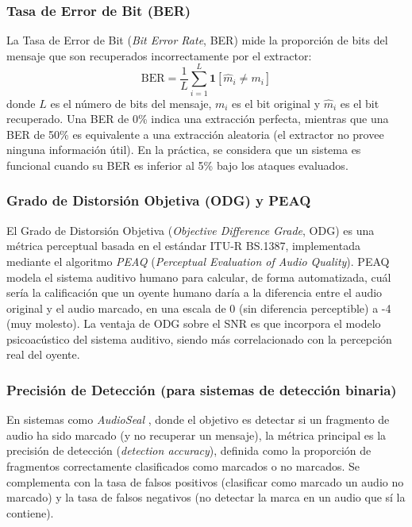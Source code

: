 \subsubsection{Tasa de Error de Bit (BER)}

La Tasa de Error de Bit (\textit{Bit Error Rate}, BER) mide la proporción de bits del mensaje que son recuperados incorrectamente por el extractor:
\begin{equation}
    \text{BER} = \frac{1}{L} \sum_{i=1}^{L} \mathbf{1}[\hat{m}_i \neq m_i]
\end{equation}
donde $L$ es el número de bits del mensaje, $m_i$ es el bit original y $\hat{m}_i$ es el bit recuperado. Una BER de 0\% indica una extracción perfecta, mientras que una BER de 50\% es equivalente a una extracción aleatoria (el extractor no provee ninguna información útil). En la práctica, se considera que un sistema es funcional cuando su BER es inferior al 5\% bajo los ataques evaluados.

\subsubsection{Grado de Distorsión Objetiva (ODG) y PEAQ}

El Grado de Distorsión Objetiva (\textit{Objective Difference Grade}, ODG) es una métrica perceptual basada en el estándar ITU-R BS.1387, implementada mediante el algoritmo \textit{PEAQ} (\textit{Perceptual Evaluation of Audio Quality}). PEAQ modela el sistema auditivo humano para calcular, de forma automatizada, cuál sería la calificación que un oyente humano daría a la diferencia entre el audio original y el audio marcado, en una escala de 0 (sin diferencia perceptible) a -4 (muy molesto). La ventaja de ODG sobre el SNR es que incorpora el modelo psicoacústico del sistema auditivo, siendo más correlacionado con la percepción real del oyente.

\subsubsection{Precisión de Detección (para sistemas de detección binaria)}

En sistemas como \textit{AudioSeal} \cite{sanroman2024audioseal}, donde el objetivo es detectar si un fragmento de audio ha sido marcado (y no recuperar un mensaje), la métrica principal es la precisión de detección (\textit{detection accuracy}), definida como la proporción de fragmentos correctamente clasificados como marcados o no marcados. Se complementa con la tasa de falsos positivos (clasificar como marcado un audio no marcado) y la tasa de falsos negativos (no detectar la marca en un audio que sí la contiene).
